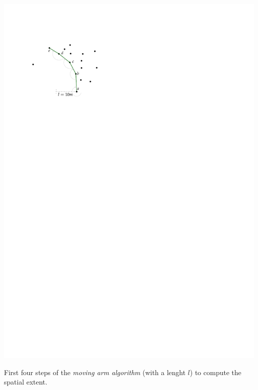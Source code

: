 \begin{marginfigure}
  \centering
  \includegraphics[page=1,width=\textwidth]{figs/movingarm.pdf}
  \caption{First four steps of the \emph{moving arm algorithm} (with a lenght $l$) to compute the spatial extent.}%
\end{marginfigure}


